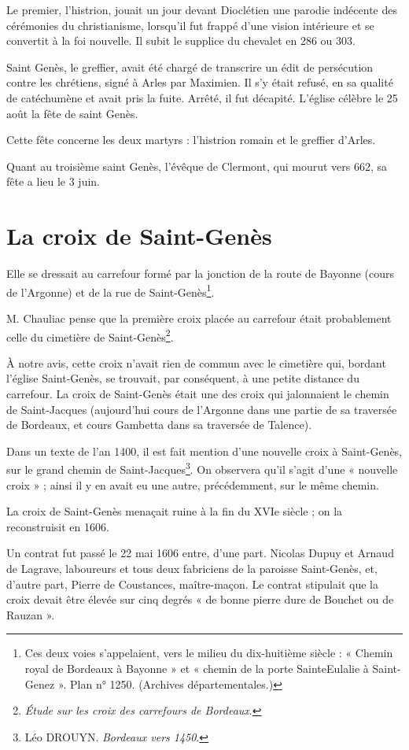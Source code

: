 Le premier, l'histrion, jouait un jour devant Dioclétien une parodie indécente des cérémonies du christianisme, lorsqu'il fut frappé d'une vision intérieure et se convertit à la foi nouvelle. Il subit le supplice du chevalet en 286 ou 303.

Saint Genès, le greffier, avait été chargé de transcrire un édit de persécution contre les chrétiens, signé à Arles par Maximien. Il s'y était refusé, en sa qualité de catéchumène et avait pris la fuite. Arrêté, il fut décapité. L'église célèbre le 25 août la fête de saint Genès.

Cette fête concerne les deux martyrs : l'histrion romain et le greffier d'Arles.

Quant au troisième saint Genès, l'évêque de Clermont, qui mourut vers 662, sa fête a lieu le 3 juin.

\section{La croix de Saint-Genès}

Elle se dressait au carrefour formé par la jonction de la route de Bayonne (cours de l'Argonne) et de la rue de Saint-Genès\footnote{Ces deux voies s'appelaient, vers le milieu du dix-huitième siècle : « Chemin royal de Bordeaux à Bayonne » et « chemin de la porte SainteEulalie à Saint-Genez ». Plan n° 1250. (Archives départementales.)}.

M. Chauliac pense que la première croix placée au carrefour était probablement celle du cimetière de Saint-Genès\footnote{\textit{Étude sur les croix des carrefours de Bordeaux}.}.

À notre avis, cette croix n'avait rien de commun avec le cimetière qui, bordant l'église Saint-Genès, se trouvait, par conséquent, à une petite distance du carrefour. La croix de Saint-Genès était une des croix qui jalonnaient le chemin de Saint-Jacques (aujourd'hui cours de l'Argonne dans une partie de sa traversée de Bordeaux, et cours Gambetta dans sa traversée de Talence).

Dans un texte de l'an 1400, il est fait mention d'une nouvelle croix à Saint-Genès, sur le grand chemin de Saint-Jacques\footnote{Léo DROUYN. \textit{Bordeaux vers 1450}.}. On observera qu'il s'agit d'une « nouvelle croix » ; ainsi il y en avait eu une autre, précédemment, sur le même chemin.

La croix de Saint-Genès menaçait ruine à la fin du XVIe siècle ; on la reconstruisit en 1606.

Un contrat fut passé le 22 mai 1606 entre, d'une part. Nicolas Dupuy et Arnaud de Lagrave, laboureurs et tous deux fabriciens de la paroisse Saint-Genès, et, d'autre part, Pierre de Coustances, maître-maçon. Le contrat stipulait que la croix devait être élevée sur cinq degrés « de bonne pierre dure de Bouchet ou de Rauzan ».

